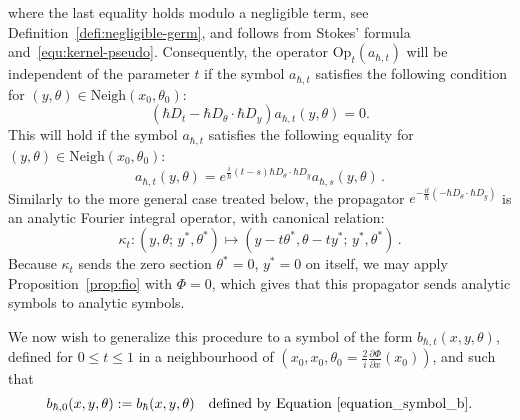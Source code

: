 \documentclass{article}
\newcommand{\Vois}{\mathrm{Neigh}}
\newcommand{\Op}{\mathrm{Op}}
\newcommand{\h}{\hbar}
\begin{document}
where the last equality holds modulo a negligible term, see
Definition~\ref{defi:negligible-germ}, and follows from Stokes'
formula and~\eqref{equ:kernel-pseudo}.  Consequently, the operator
$ \Op_t(a_{ \hbar, t})$ will be independent of the parameter $t$ if
the symbol $a_{\hbar, t}$ satisfies the following condition for
$(y, \theta) \in \Vois \left( x_0, \theta_0 \right)$:
\[
\left( \hbar D_t - \hbar D_{ \theta} \cdot \hbar D_y \right) a_{\hbar,
  t}(y, \theta) = 0.
\]
This will hold if the symbol $a_{ \hbar, t}$ satisfies the following
equality for $(y, \theta) \in \Vois \left( x_0, \theta_0\right)$:
\[
a_{ \hbar, t}(y, \theta) = e^{\frac{i}{\h}(t-s) \hbar D_{ \theta}
  \cdot \hbar D_y} a_{ \hbar, s} (y, \theta)\,.
\]
Similarly to the more general case treated below, the propagator
$e^{-\frac{it}{\h} (-\hbar D_{ \theta} \cdot \hbar D_y)}$ is an
analytic Fourier integral operator, with canonical relation:
\[
\kappa_t : (y, \theta;\, y^*, \theta^*) \mapsto (y-t \theta^*, \theta
- t y^*;\, y^*, \theta^*)\, .
\]
Because $ \kappa_t$ sends the zero section $\theta^* = 0$, $y^* = 0$
on itself, we may apply Proposition~\ref{prop:fio} with $\Phi=0$,
which gives that this propagator sends analytic symbols to analytic
symbols.


\medskip

We now wish to generalize this procedure to a symbol of the form
$b_{ \hbar, t}(x, y, \theta)$, defined for $0 \leq t \leq 1$ in a
neighbourhood of
$\left( x_0, x_0, \theta_0 = \frac{2}{i} \frac{\partial \Phi}{\partial
    x}(x_0) \right)$, and such that
\[
b_{ \hbar, 0}(x, y, \theta) := b_{ \hbar}(x, y, \theta) \quad
\text{defined by Equation \eqref{equation_symbol_b}}.
\]
\end{document}
